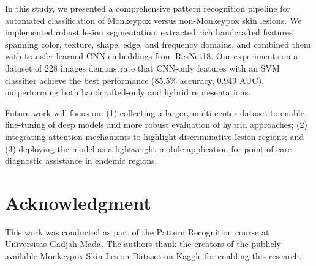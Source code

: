 \documentclass[conference]{IEEEtran}
\begin{document}
In this study, we presented a comprehensive pattern recognition
pipeline for automated classification of Monkeypox versus
non-Monkeypox skin lesions. We implemented robust lesion
segmentation, extracted rich handcrafted features spanning color,
texture, shape, edge, and frequency domains, and combined them with
transfer-learned CNN embeddings from ResNet18. Our experiments on
a dataset of 228 images demonstrate that CNN-only features with an
SVM classifier achieve the best performance (85.5\% accuracy, 0.949
AUC), outperforming both handcrafted-only and hybrid
representations.

Future work will focus on: (1) collecting a larger, multi-center
dataset to enable fine-tuning of deep models and more robust
evaluation of hybrid approaches; (2) integrating attention mechanisms
to highlight discriminative lesion regions; and (3) deploying the
model as a lightweight mobile application for point-of-care
diagnostic assistance in endemic regions.

\section*{Acknowledgment}

This work was conducted as part of the Pattern Recognition course
at Universitas Gadjah Mada. The authors thank the creators of the
publicly available Monkeypox Skin Lesion Dataset on Kaggle for
enabling this research.
\end{document}
